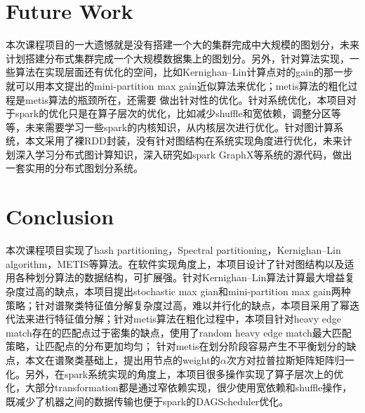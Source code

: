 \section{Future Work}

本次课程项目的一大遗憾就是没有搭建一个大的集群完成中大规模的图划分，未来计划搭建分布式集群完成一个大规模数据集上的图划分。另外，针对算法实现，一些算法在实现层面还有优化的空间，比如Kernighan–Lin计算点对的gain的那一步就可以用本文提出的mini-partition max gain近似算法来优化；metis算法的粗化过程是metis算法的瓶颈所在，还需要
做出针对性的优化。针对系统优化，本项目对于spark的优化只是在算子层次的优化，比如减少shuffle和宽依赖，调整分区等等，未来需要学习一些spark的内核知识，从内核层次进行优化。针对图计算系统，本文采用了裸RDD封装，没有针对图结构在系统实现角度进行优化，未来计划深入学习分布式图计算知识，深入研究如spark GraphX等系统的源代码，做出一套实用的分布式图划分系统。


\section{Conclusion}
本次课程项目实现了hash partitioning，Spectral partitioning，Kernighan–Lin algorithm，METIS等算法。在软件实现角度上，本项目设计了针对图结构以及适用各种划分算法的数据结构，可扩展强。针对Kernighan–Lin算法计算最大增益复杂度过高的缺点，本项目提出stochastic max gian和mini-partition max gain两种策略；针对谱聚类特征值分解复杂度过高，难以并行化的缺点，本项目采用了幂迭代法来进行特征值分解；针对metis算法在粗化过程中，本项目针对heavy edge match存在的匹配点过于密集的缺点，使用了random heavy edge match最大匹配策略，让匹配点的分布更加均匀；
针对metis在划分阶段容易产生不平衡划分的缺点，本文在谱聚类基础上，提出用节点的weight的$\alpha$次方对拉普拉斯矩阵矩阵归一化。另外，在spark系统实现的角度上，本项目很多操作实现了算子层次上的优化，大部分transformation都是通过窄依赖实现，很少使用宽依赖和shuffle操作，既减少了机器之间的数据传输也便于spark的DAGScheduler优化。